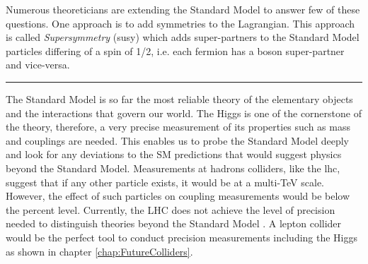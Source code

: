 Numerous theoreticians are extending the Standard Model to answer few of these questions. One approach is to add symmetries to the Lagrangian. This approach is called \textit{Supersymmetry} (\acrshort{susy}) which adds super-partners to the Standard Model particles differing of a spin of 1/2, i.e. each fermion has a boson super-partner and vice-versa.

\begin{center}
  \rule{0.5\textwidth}{.4pt}
\end{center}

The Standard Model is so far the most reliable theory of the elementary objects and the interactions that govern our world. The Higgs is one of the cornerstone of the theory, therefore, a very precise measurement of its properties such as mass and couplings are needed. This enables us to probe the Standard Model deeply and look for any deviations to the SM predictions that would suggest physics beyond the Standard Model. Measurements at hadrons colliders, like the \acrlong{lhc}, suggest that if any other particle exists, it would be at a multi-TeV scale. However, the effect of such particles on coupling measurements would be below the percent level. Currently, the LHC does not achieve the level of precision needed to distinguish theories beyond the Standard Model \cite{CMS:2013xfa}. A lepton collider would be the perfect tool to conduct precision measurements including the Higgs as shown in chapter \ref{chap:FutureColliders}.

